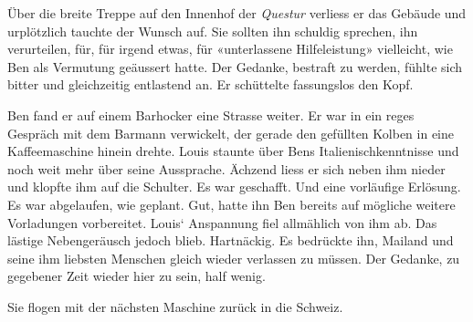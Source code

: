 Über die breite Treppe auf den Innenhof der
\emph{Questur} verliess er das Gebäude und urplötzlich tauchte der Wunsch auf. Sie sollten ihn schuldig
sprechen, ihn verurteilen, für, für irgend etwas, für «unterlassene
Hilfeleistung» vielleicht, wie Ben als Vermutung geäussert hatte. Der
Gedanke, bestraft zu werden, fühlte sich bitter und gleichzeitig entlastend an. Er schüttelte fassungslos den Kopf.

Ben fand er auf einem Barhocker eine Strasse weiter. Er war in ein reges
Gespräch mit dem Barmann verwickelt, der gerade den gefüllten Kolben in
eine Kaffeemaschine hinein drehte. Louis staunte über Bens
Italienischkenntnisse und noch weit mehr über seine Aussprache. Ächzend liess er sich neben ihm nieder und klopfte ihm auf die Schulter.
Es war geschafft. Und eine vorläufige Erlösung. Es war abgelaufen, wie
geplant. Gut, hatte ihn Ben bereits auf mögliche weitere Vorladungen
vorbereitet.
Louis` Anspannung fiel allmählich von ihm ab. Das lästige Nebengeräusch
jedoch blieb. Hartnäckig. Es bedrückte ihn, Mailand und seine ihm liebsten Menschen gleich
wieder verlassen zu müssen. Der Gedanke, zu gegebener Zeit wieder hier zu sein,
half wenig.

Sie flogen mit der nächsten Maschine zurück in die Schweiz.
